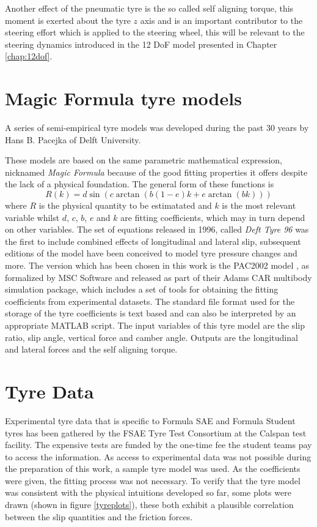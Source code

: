 Another effect of the pneumatic tyre is the so called self aligning torque, this moment is exerted about the tyre $z$ axis and is an important contributor to the steering effort which is applied to the steering wheel, this will be relevant to the steering dynamics introduced in the 12 DoF model presented in Chapter \ref{chap:12dof}.

\section{Magic Formula tyre models}
\label{sec:mf}
A series of semi-empirical tyre models was developed during the past 30 years by Hans B. Pacejka of Delft University.

These models are based on the same parametric mathematical expression, nicknamed \textit{Magic Formula} because of the good fitting properties it offers despite the lack of a physical foundation. The general form of these functions is
$$ R(k) = d\sin(c\arctan(b(1-e)k+e\arctan(bk))) $$
where $R$ is the physical quantity to be estimatated and $k$ is the most relevant variable whilst $d$, $c$, $b$, $e$ and $k$ are fitting coefficients, which may in turn depend on other variables.
The set of equations released in 1996, called \textit{Deft Tyre 96} \cite{pac96} was the first to include combined effects of longitudinal and lateral slip, subsequent editions of the model have been conceived to model tyre pressure changes \cite{pac10} and more.
The version which has been chosen in this work is the PAC2002 model \cite{pac2002}, as formalized by MSC Software and released as part of their Adams CAR multibody simulation package, which includes a set of tools for obtaining the fitting coefficients from experimental datasets. The standard file format used for the storage of the tyre coefficients is text based and can also be interpreted by an appropriate MATLAB script\cite{loadtir}.
The input variables of this tyre model are the slip ratio, slip angle, vertical force and camber angle. Outputs are the longitudinal and lateral forces and the self aligning torque.

\section{Tyre Data}
\label{sec:tyredata}

Experimental tyre data that is specific to Formula SAE and Formula Student tyres has been gathered by the FSAE Tyre Test Consortium  at the Calspan test facility. The expensive tests are funded by the one-time fee the student teams pay to access the information.
As access to experimental data was not possible during the preparation of this work, a sample tyre model was used. As the coefficients were given, the fitting process was not necessary.
To verify that the tyre model was consistent with the physical intuitions developed so far, some plots were drawn (shown in figure \ref{tyreplots}), these both exhibit a plausible correlation between the slip quantities and the friction forces.

